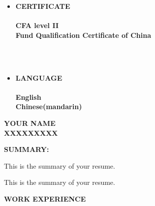 \documentclass{ctexart}
\theoremstyle{plain}
\begin{document}
\begin{paracol}{2}
\begin{itemize}
		\\\hspace*{\fill}\\
		
		
		\item{\MakeUppercase{\LARGE\textbf{certificate}} %
		\\\hspace*{\fill}\\
		\normalsize\textbf{CFA level II\\Fund Qualification Certificate of China}}
		
		
		\\\hspace*{\fill}\\	
		
		\item{\MakeUppercase{\LARGE\textbf{language}} %
		\\\hspace*{\fill}\\
		\normalsize\textbf{English\\Chinese(mandarin)}}
	\end{itemize}
	
	\switchcolumn %
	
	
	\smash{\rule[-1\textheight]{2pt}{1\textheight}}
		
	\begin{center}
	
	\MakeUppercase{\Huge\textbf{your name}}\\
	\MakeUppercase{\normalsize\textbf{xxxxxxxxx}}
	\end{center}
	\begin{flushleft}
	
	\hspace*{.05\linewidth}
	{
	\MakeUppercase{\normalsize\textbf{summary: }}}
	
	\hspace*{.05\linewidth}
	{
	{This is the summary of your resume.}
	}
	
	\hspace*{.05\linewidth}
	{
	{This is the summary of your resume.}
	}
	
	\end{flushleft}
	
	\begin{flushleft}
	\hspace*{.05\linewidth} %
	\MakeUppercase{\Large\textbf{Work Experience}} %
	\end{flushleft}
		

\end{paracol}
\end{document}
